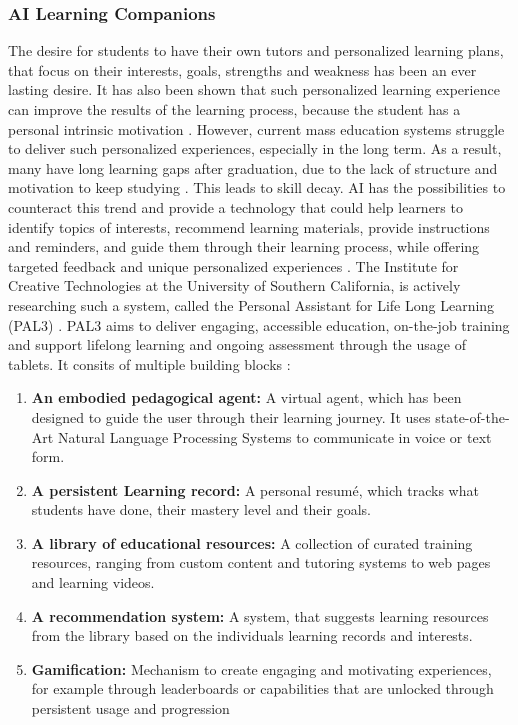 \documentclass{Academic}
\begin{document}
    \subsubsection{AI Learning Companions}
    The desire for students to have their own tutors and personalized learning plans, that focus on their interests, goals, strengths and weakness has been an ever lasting desire. It has also been shown that such personalized learning experience can improve the results of the learning process, because the student has a personal intrinsic motivation \cite{holmes_artificial_2023}. However, current mass education systems struggle to deliver such personalized experiences, especially in the long term. As a result, many have long learning gaps after graduation, due to the lack of structure and motivation to keep studying \cite{bill_swartout_personal_nodate}. This leads to skill decay. AI has the possibilities to counteract this trend and provide a technology that could help learners to identify topics of interests, recommend learning materials, provide instructions and reminders, and guide them through their learning process, while offering targeted feedback and unique personalized experiences \cite{holmes_artificial_2023}. The Institute for Creative Technologies at the University of Southern California, is actively researching such a system, called the Personal Assistant for Life Long Learning (PAL3) \cite{bill_swartout_personal_nodate}. PAL3 aims to deliver engaging, accessible education, on-the-job training and support lifelong learning and ongoing assessment through the usage of tablets. It consits of multiple building blocks \cite{bill_swartout_personal_nodate}:
    \begin{enumerate}
        \item \textbf{An embodied pedagogical agent:} A virtual agent, which has been designed to guide the user through their learning journey. It uses state-of-the-Art Natural Language Processing Systems to communicate in voice or text form.
        \item \textbf{A persistent Learning record:} A personal resumé, which tracks what students have done, their mastery level and their goals.
        \item \textbf{A library of educational resources:} A collection of curated training resources, ranging from custom content and tutoring systems to web pages and learning videos.
        \item \textbf{A recommendation system:} A system, that suggests learning resources from the library based on the individuals learning records and interests.
        \item \textbf{Gamification:} Mechanism to create engaging and motivating experiences, for example through leaderboards or capabilities that are unlocked through persistent usage and progression
    \end{enumerate}
\end{document}
